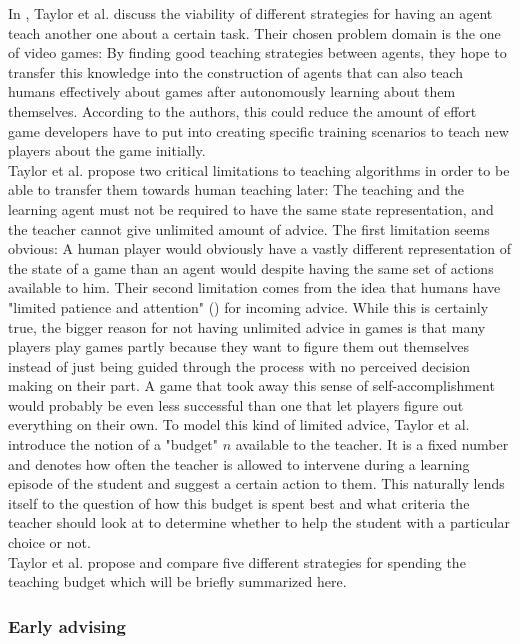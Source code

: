 \documentclass[12pt,twoside]{article}
\theoremstyle{plain}
\theoremstyle{definition}
\theoremstyle{remark}
\begin{document}
In \cite{Taylor2014reinforcement}, Taylor et al. discuss the viability of different strategies for having an agent teach another one about a certain task. Their chosen problem domain is the one of video games: By finding good teaching strategies between agents, they hope to transfer this knowledge into the construction of agents that can also teach humans effectively about games after autonomously learning about them themselves. According to the authors, this could reduce the amount of effort game developers have to put into creating specific training scenarios to teach new players about the game initially. \\
Taylor et al. propose two critical limitations to teaching algorithms in order to be able to transfer them towards human teaching later: The teaching and the learning agent must not be required to have the same state representation, and the teacher cannot give unlimited amount of advice. The first limitation seems obvious: A human player would obviously have a vastly different representation of the state of a game than an agent would despite having the same set of actions available to him. Their second limitation comes from the idea that humans have "limited patience and attention" (\cite{Taylor2014reinforcement}) for incoming advice. While this is certainly true, the bigger reason for not having unlimited advice in games is that many players play games partly because they want to figure them out themselves instead of just being guided through the process with no perceived decision making on their part. A game that took away this sense of self-accomplishment would probably be even less successful than one that let players figure out everything on their own.
To model this kind of limited advice, Taylor et al. introduce the notion of a "budget" $n$ available to the teacher. It is a fixed number and denotes how often the teacher is allowed to intervene during a learning episode of the student and suggest a certain action to them. This naturally lends itself to the question of how this budget is spent best and what criteria the teacher should look at to determine whether to help the student with a particular choice or not. \\
Taylor et al. propose and compare five different strategies for spending the teaching budget which will be briefly summarized here.

\subsubsection{Early advising}
\end{document}
